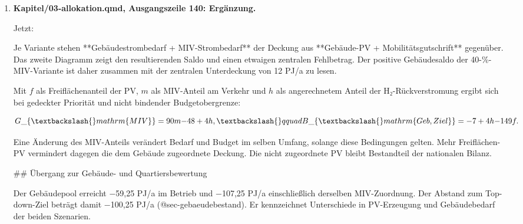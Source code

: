 \documentclass[
  ngerman,
  a4paper,
  DIV=11]{scrreprt}
\newenvironment{Shaded}{\begin{snugshade}}{\end{snugshade}}
\newcommand{\NormalTok}[1]{\textcolor[rgb]{0.00,0.23,0.31}{#1}}
\begin{document}
\begin{enumerate}
  Jetzt:

\begin{Shaded}
\begin{Highlighting}[]
\NormalTok{::: \{.content{-}visible when{-}format="html"\}}
\NormalTok{\textasciigrave{}\textasciigrave{}\textasciigrave{}\{=html\}}
\NormalTok{\textless{}iframe src="../Abbildungen/methodik/allokation\_saldo.html" title="Saldo und zentrale Unterdeckung je Variante" style="width:100\%;height:620px;border:0" loading="lazy"\textgreater{}\textless{}/iframe\textgreater{}}
\NormalTok{\textasciigrave{}\textasciigrave{}\textasciigrave{}}
\NormalTok{[Grafik separat öffnen](../Abbildungen/methodik/allokation\_saldo.html)}
\end{Highlighting}
\end{Shaded}
\item
  \textbf{Kapitel/03-allokation.qmd, Ausgangszeile 140: Ergänzung.}

  Jetzt:

\begin{Shaded}
\begin{Highlighting}[]


\NormalTok{Je Variante stehen **Gebäudestrombedarf + MIV{-}Strombedarf** der Deckung aus **Gebäude{-}PV + Mobilitätsgutschrift** gegenüber. Das zweite Diagramm zeigt den resultierenden Saldo und einen etwaigen zentralen Fehlbetrag. Der positive Gebäudesaldo der 40{-}\%{-}MIV{-}Variante ist daher zusammen mit der zentralen Unterdeckung von 12 PJ/a zu lesen.}

\NormalTok{Mit $f$ als Freiflächenanteil der PV, $m$ als MIV{-}Anteil am Verkehr und $h$ als angerechnetem Anteil der H₂{-}Rückverstromung ergibt sich bei gedeckter Priorität und nicht bindender Budgetobergrenze:}

\NormalTok{$$G\_\{\textbackslash{}mathrm\{MIV\}\}=90m{-}48+4h,\textbackslash{}qquad B\_\{\textbackslash{}mathrm\{Geb,Ziel\}\}={-}7+4h{-}149f.$$}

\NormalTok{Eine Änderung des MIV{-}Anteils verändert Bedarf und Budget im selben Umfang, solange diese Bedingungen gelten. Mehr Freiflächen{-}PV vermindert dagegen die dem Gebäude zugeordnete Deckung. Die nicht zugeordnete PV bleibt Bestandteil der nationalen Bilanz.}

\NormalTok{\#\# Übergang zur Gebäude{-} und Quartiersbewertung}

\NormalTok{Der Gebäudepool erreicht −59,25 PJ/a im Betrieb und −107,25 PJ/a einschließlich derselben MIV{-}Zuordnung. Der Abstand zum Top{-}down{-}Ziel beträgt damit −100,25 PJ/a (@sec{-}gebaeudebestand). Er kennzeichnet Unterschiede in PV{-}Erzeugung und Gebäudebedarf der beiden Szenarien.}


\end{Highlighting}
\end{Shaded}
\end{enumerate}
\end{document}

